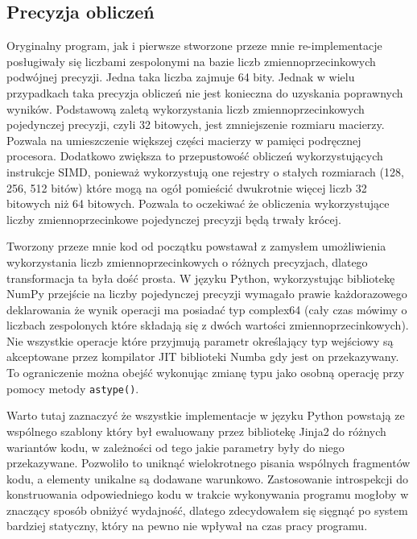 \documentclass[11pt, a4paper]{article}
\newcommand{\code}[1]{\texttt{#1}}
\begin{document}
\begin{sloppypar}
    \subsection{Precyzja obliczeń}
    Oryginalny program, jak i pierwsze stworzone przeze mnie re-implementacje posługiwały
    się liczbami zespolonymi na bazie liczb zmiennoprzecinkowych podwójnej precyzji.
    Jedna taka liczba zajmuje 64 bity. Jednak w wielu przypadkach taka precyzja obliczeń
    nie jest konieczna do uzyskania poprawnych wyników. Podstawową zaletą wykorzystania
    liczb zmiennoprzecinkowych pojedynczej precyzji, czyli 32 bitowych, jest
    zmniejszenie rozmiaru macierzy. Pozwala na umieszczenie większej części macierzy w pamięci
    podręcznej procesora. Dodatkowo zwiększa to przepustowość obliczeń wykorzystujących
    instrukcje SIMD, ponieważ wykorzystują one rejestry o stałych rozmiarach (128, 256,
    512 bitów) które mogą na ogół pomieścić dwukrotnie więcej liczb 32 bitowych niż 64 bitowych.
    Pozwala to oczekiwać że obliczenia wykorzystujące liczby zmiennoprzecinkowe
    pojedynczej precyzji będą trwały krócej.

    Tworzony przeze mnie kod od początku powstawał z zamysłem umożliwienia wykorzystania
    liczb zmiennoprzecinkowych o różnych precyzjach, dlatego transformacja ta była dość prosta.
    W języku Python, wykorzystując bibliotekę NumPy przejście na liczby pojedynczej precyzji
    wymagało prawie każdorazowego deklarowania że wynik operacji ma posiadać typ complex64
    (cały czas mówimy o liczbach zespolonych które składają się z dwóch wartości
    zmiennoprzecinkowych). Nie wszystkie operacje które przyjmują parametr określający
    typ wejściowy są akceptowane przez kompilator JIT biblioteki Numba gdy jest on
    przekazywany. To ograniczenie można obejść wykonując zmianę typu jako osobną operację
    przy pomocy metody \code{astype()}.

    Warto tutaj zaznaczyć że wszystkie implementacje w języku Python powstają ze
    wspólnego szablony który był ewaluowany przez bibliotekę Jinja2 do różnych wariantów
    kodu, w zależności od tego jakie parametry były do niego przekazywane. Pozwoliło to
    uniknąć wielokrotnego pisania wspólnych fragmentów kodu, a elementy unikalne są dodawane
    warunkowo. Zastosowanie introspekcji do konstruowania odpowiedniego kodu w trakcie
    wykonywania programu mogłoby w znaczący sposób obniżyć wydajność, dlatego zdecydowałem
    się sięgnąć po system bardziej statyczny, który na pewno nie wpływał na czas pracy
    programu.


\end{sloppypar}
\end{document}
